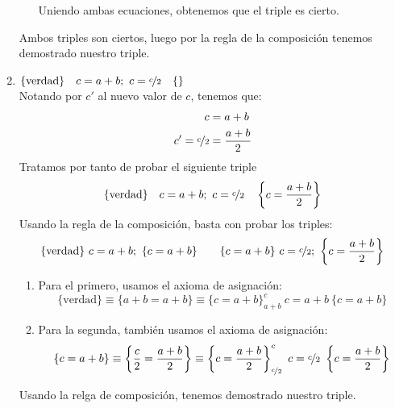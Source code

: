 \begin{ejercicio}
\begin{enumerate}
\begin{enumerate}
                Uniendo ambas ecuaciones, obtenemos que el triple es cierto.
            \end{enumerate}
            Ambos triples son ciertos, luego por la regla de la composición tenemos demostrado nuestro triple.
        \item $\{\text{verdad}\} \quad c = a + b;~c = \nicefrac{c}{2} \quad \{ \}$\\
            Notando por $c'$ al nuevo valor de $c$, tenemos que:
            \begin{align*}
                c &= a + b \\
                c' = \nicefrac{c}{2} &= \frac{a+b}{2}
            \end{align*}
            Tratamos por tanto de probar el siguiente triple
            \begin{equation*}
                \{\text{verdad}\} \quad c = a + b;~c = \nicefrac{c}{2} \quad \left\{c=\frac{a+b}{2}\right\}
            \end{equation*}
            Usando la regla de la composición, basta con probar los triples:
            \begin{equation*}
                \{\text{verdad}\}\ c=a+b;\ \{c=a+b\} \qquad \{c=a+b\}\ c=\nicefrac{c}{2};\ \left\{c=\frac{a+b}{2}\right\}
            \end{equation*}
            \begin{enumerate}
                \item Para el primero, usamos el axioma de asignación:
                    \begin{equation*}
                        \{\text{verdad}\}\equiv\{a+b=a+b\}\equiv \{c=a+b\}^c_{a+b}\ c=a+b\ \{c=a+b\}
                    \end{equation*}
                \item Para la segunda, también usamos el axioma de asignación:
                    \begin{equation*}
                        \{c=a+b\}\equiv \left\{\frac{c}{2} = \frac{a+b}{2}\right\} \equiv \left\{c=\frac{a+b}{2}\right\}^c_{\nicefrac{c}{2}}\ c=\nicefrac{c}{2}\ \left\{c=\frac{a+b}{2}\right\}
                    \end{equation*}
            \end{enumerate}
            Usando la relga de composición, tenemos demostrado nuestro triple.
    \end{enumerate}
\end{ejercicio}

